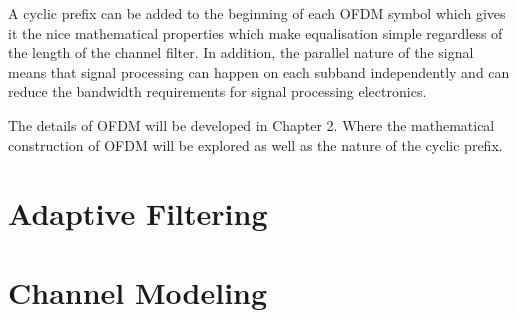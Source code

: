 A cyclic prefix can be added to the beginning of each OFDM %
symbol which gives it the nice mathematical properties %
which make equalisation simple regardless of the length %
of the channel filter. In addition, the parallel nature %
of the signal means that signal processing can happen %
on each subband independently and can reduce the bandwidth %
requirements for signal processing electronics.

The details of OFDM will be developed in Chapter 2. 
Where the mathematical construction of OFDM will be
explored as well as the nature of the cyclic prefix.

\section{Adaptive Filtering}


\section{Channel Modeling}


